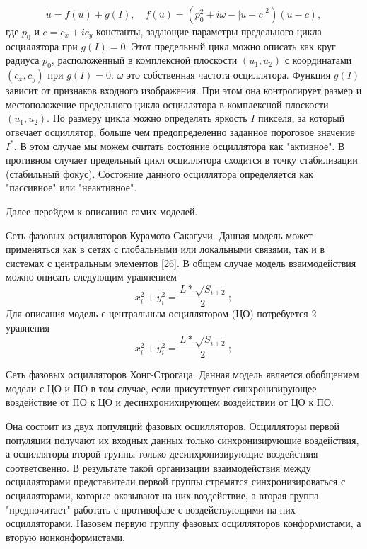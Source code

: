 \documentclass[14pt, russian]{scrartcl}
\begin{document}
\begin{enumerate}
        \begin{equation}\label{eq:3}
            \dot{u} = f(u) + g(I), \quad f(u) = (p^2_0 + i\omega - |u - c|^2)(u - c),
        \end{equation}где $p_0$ и $c = c_x + ic_y$ константы, задающие параметры предельного цикла осциллятора при $g(I) = 0$. Этот предельный цикл можно описать как круг радиуса $p_0$, расположенный в комплексной плоскости $(u_1, u_2)$ с координатами $(c_x, c_y)$ при $g(I) = 0$. $\omega$ это собственная частота осциллятора. 
        Функция $g(I)$ зависит от признаков входного изображения. При этом она контролирует размер и местоположение предельного цикла осциллятора в комплексной плоскости $(u_1, u_2)$. По размеру цикла можно определять яркость $I$ пикселя, за который отвечает осциллятор, больше чем предопределенно заданное пороговое значение $I^*$.
        В этом случае мы можем считать состояние осциллятора как "активное". В противном случает предельный цикл осциллятора сходится в точку стабилизации (стабильный фокус). Состояние данного осциллятора определяется как "пассивное" или "неактивное".
\end{enumerate}

Далее перейдем к описанию самих моделей.

Сеть фазовых осцилляторов Курамото-Сакагучи. Данная модель может применяться как в сетях с глобальными или локальными связями, так и в системах с центральным элементов [26]. В общем случае модель взаимодействия можно описать следующим уравнением
\begin{equation}\label{eq:4}
    x_i^2 + y^2_i = \frac{L*\sqrt{S_{i+2}}}{2}\,;
\end{equation}
Для описания модель с центральным осциллятором (ЦО) потребуется 2 уравнения
\begin{equation}\label{eq:5}
    x_i^2 + y^2_i = \frac{L*\sqrt{S_{i+2}}}{2}\,;
\end{equation}

Сеть фазовых осцилляторов Хонг-Строгаца. Данная модель является обобщением модели с ЦО и ПО в том случае, если присутствует синхронизирующее воздействие от ПО к ЦО и десинхронихирующем воздействии от ЦО к ПО.

Она состоит из двух популяций фазовых осцилляторов. Осцилляторы первой популяции получают их входных данных только синхронизирующие воздействия, а осцилляторы второй группы только десинхронизирующие воздействия соответсвенно. В результате такой организации взаимодействия между осцилляторами представители первой группы стремятся синхронизироваться с осцилляторами, которые оказывают на них воздействие, а вторая группа "предпочитает" работать с противофазе с воздействующими на них осцилляторами. Назовем первую группу фазовых осцилляторов конформистами, а вторую нонконформистами.
\end{document}
